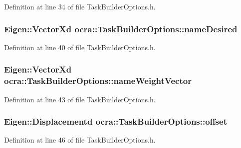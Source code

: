 Definition at line 34 of file Task\+Builder\+Options.\+h.

\subsubsection[{\texorpdfstring{name\+Desired}{nameDesired}}]{\setlength{\rightskip}{0pt plus 5cm}Eigen\+::\+Vector\+Xd ocra\+::\+Task\+Builder\+Options\+::name\+Desired}\hypertarget{classocra_1_1TaskBuilderOptions_a1e2cceed21f5b42fbfba16f02ee87bc7}{}\label{classocra_1_1TaskBuilderOptions_a1e2cceed21f5b42fbfba16f02ee87bc7}


Definition at line 40 of file Task\+Builder\+Options.\+h.

\subsubsection[{\texorpdfstring{name\+Weight\+Vector}{nameWeightVector}}]{\setlength{\rightskip}{0pt plus 5cm}Eigen\+::\+Vector\+Xd ocra\+::\+Task\+Builder\+Options\+::name\+Weight\+Vector}\hypertarget{classocra_1_1TaskBuilderOptions_a82a7eaa6cb0887e59c99cc4f97d2c818}{}\label{classocra_1_1TaskBuilderOptions_a82a7eaa6cb0887e59c99cc4f97d2c818}


Definition at line 43 of file Task\+Builder\+Options.\+h.

\subsubsection[{\texorpdfstring{offset}{offset}}]{\setlength{\rightskip}{0pt plus 5cm}Eigen\+::\+Displacementd ocra\+::\+Task\+Builder\+Options\+::offset}\hypertarget{classocra_1_1TaskBuilderOptions_a6c632afc050c25f7bb5631fbe7741c93}{}\label{classocra_1_1TaskBuilderOptions_a6c632afc050c25f7bb5631fbe7741c93}


Definition at line 46 of file Task\+Builder\+Options.\+h.


